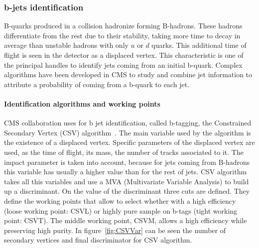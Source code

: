 \subsubsection{b-jets identification}
\label{sec:bid}

B-quarks produced in a collision hadronize forming B-hadrons. These hadrons differentiate from the rest due to their stability, taking more time to decay in average than unstable hadrons with only $u$ or $d$ quarks. This additional time of flight is seen in the detector as a displaced vertex. This characteristic is one of the principal handles to identify jets coming from an initial b-quark. Complex algorithms have been developed in CMS to study and combine jet information to attribute a probability of coming from a b-quark to each jet.  

\paragraph{Identification algorithms and working points}

CMS collaboration uses for b jet identification, called b-tagging, the Constrained Secondary Vertex (CSV) algorithm~\cite{Chatrchyan:2012jua, CMS:2013vea}. The main variable used by the algorithm is the existence of a displaced vertex. Specific parameters of the displaced vertex are used, as the time of flight, its mass, the number of tracks associated to it. The impact parameter is taken into account, because for jets coming from B-hadrons this variable has usually a higher value than for the rest of jets. CSV algorithm takes all this variables and use a MVA (Multivariate Variable Analysis) to build up a discriminant. On the value of the discriminant three cuts are defined. They define the working points that allow to select whether with a high efficiency (loose working point: CSVL) or highly pure sample on b-tags (tight working point: CSVT). The middle working point, CSVM, allows a high efficiency while preserving high purity. In figure~\ref{fig:CSVVar} can be seen the number of secondary vertices and final discriminator for CSV algorithm.

